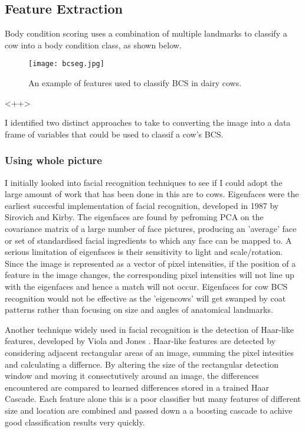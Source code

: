 \documentclass[11pt]{article}
\begin{document}
\subsection{Feature Extraction}
	Body condition scoring uses a combination of multiple landmarks to classify a cow into a body condition class, as shown below.
	\begin{figure}[h!]
		\centering
		\texttt{[image: bcseg.jpg]}
		\caption{An example of features used to classify BCS in dairy cows. \cite{Elanco}}
		\label{fig:<+label+>}
	\end{figure}<++>


	I identified two distinct approaches to take to converting the image into a data frame of variables that could be used to classif a cow's BCS.

	\subsubsection{Using whole picture}
	I initially looked into facial recognition techniques to see if I could adopt the large amount of work that has been done in this are to cows.
	Eigenfaces were the earliest succesful implementation of facial recognition, developed in 1987 by Sirovich and Kirby.
	The eigenfaces are found by pefroming PCA on the covariance matrix of a large number of face pictures, producing an 'average' face or set of standardised facial ingredients to which any face can be mapped to.
	A serious limitation of eigenfaces is their sensitivity to light and scale/rotation. 
	Since the image is represented as a vector of pixel intensities, if the position of a feature in the image changes, the corresponding pixel intensities will not line up with the eigenfaces and hence a match will not occur.
	Eigenfaces for cow BCS recognition would not be effective as the 'eigencows' will get swanped by coat patterns rather than focusing on size and angles of anatomical landmarks.



	Another technique widely used in facial recognition is the detection of Haar-like features, developed by Viola and Jones \cite{Electric2004}.
	Haar-like features are detected by considering adjacent rectangular areas of an image, summing the pixel intesities and calculating a differnce. 
	By altering the size of the rectangular detection window and moving it consectutively around an image, the differences encountered are compared to learned differences stored in a trained Haar Cascade.
	Each feature alone this is a poor classifier but many features of different size and location are combined and passed down a a boosting cascade to achive good classification results very quickly.
	
\end{document}
